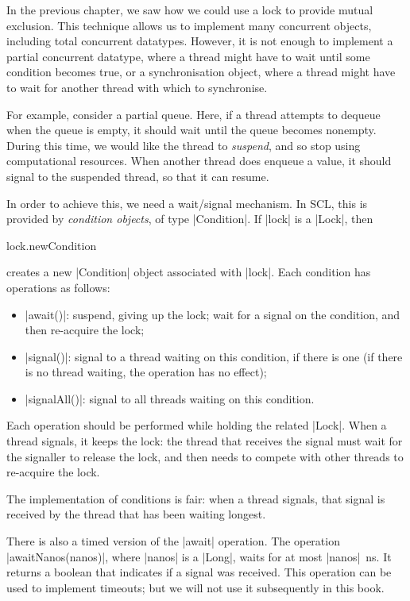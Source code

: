 In the previous chapter, we saw how we could use a lock to provide mutual
exclusion.  This technique allows us to implement many concurrent objects,
including total concurrent datatypes.  However, it is not enough to implement
a partial concurrent datatype, where a thread might have to wait until some
condition becomes true, or a synchronisation object, where a thread might have
to wait for another thread with which to synchronise. 

For example, consider a partial queue.  Here, if a thread attempts to dequeue
when the queue is empty, it should wait until the queue becomes nonempty.
During this time, we would like the thread to \emph{suspend}, and so stop
using computational resources.  When another thread does enqueue a value, it
should signal to the suspended thread, so that it can resume.  

In order to achieve this, we need a wait/signal mechanism.  In SCL, this is
provided by \emph{condition objects}, of type
|Condition|.  If |lock| is a
|Lock|, then
\begin{scala}
  lock.newCondition
\end{scala}
creates a new |Condition| object associated with |lock|.  
Each condition has operations as follows:
%
\begin{itemize}
\item |await()|: suspend, giving up the lock; wait for a
signal on the condition, and then re-acquire the lock;

\item |signal()|: signal to a thread waiting on this
condition, if there is one (if there is no thread waiting, the operation has
  no effect);

\item |signalAll()|: signal to all threads waiting on this
  condition.
\end{itemize}
%
Each operation should be performed while holding the related |Lock|.  When a
thread signals, it keeps the lock: the thread that receives the signal must
wait for the signaller to release the lock, and then needs to compete with
other threads to re-acquire the lock. 

The implementation of conditions is fair: when a thread signals, that
signal is received by the thread that has been waiting longest. 

There is also a timed version of the |await| operation.  The operation
|awaitNanos(nanos)|, where |nanos| is a |Long|, waits for
at most |nanos|~ns.  It returns a boolean that indicates if a signal was
received.  This operation can be used to implement timeouts; but we will not
use it subsequently in this book.

